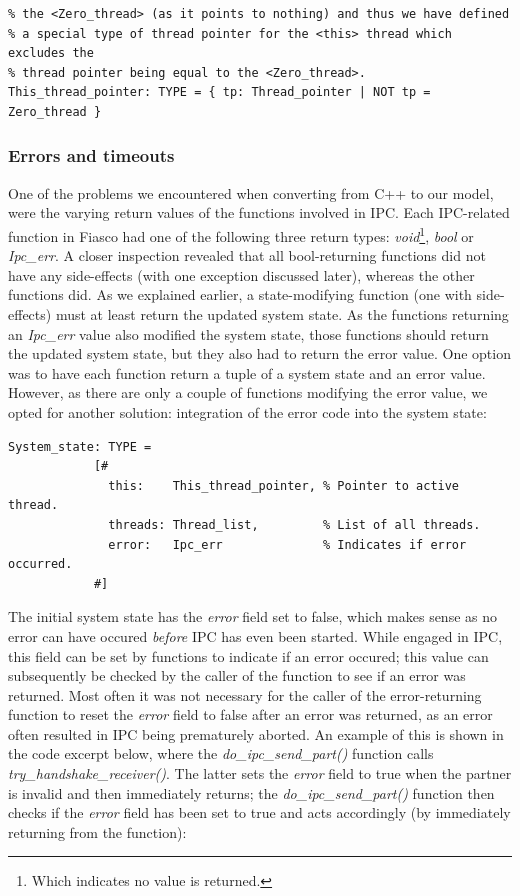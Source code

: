 \lstset{language=PVS}
\begin{lstlisting}[caption={PVS: definition of special this pointer type.}]
% The pointer to the current active thread (the <this> thread) must never be
% the <Zero_thread> (as it points to nothing) and thus we have defined
% a special type of thread pointer for the <this> thread which excludes the
% thread pointer being equal to the <Zero_thread>.
This_thread_pointer: TYPE = { tp: Thread_pointer | NOT tp = Zero_thread }
\end{lstlisting}

\subsubsection{Errors and timeouts}
One of the problems we encountered when converting from C++ to our model, were the varying return values of the functions involved in IPC. Each IPC-related function in Fiasco had one of the following three return types: \emph{void}\footnote{Which indicates no value is returned.}, \emph{bool} or \emph{Ipc\_err}. A closer inspection revealed that all bool-returning functions did not have any side-effects (with one exception discussed later), whereas the other functions did. As we explained earlier, a state-modifying function (one with side-effects) must at least return the updated system state. As the functions returning an \emph{Ipc\_err} value also modified the system state, those functions should return the updated system state, but they also had to return the error value. One option was to have each function return a tuple of a system state and an error value. However, as there are only a couple of functions modifying the error value, we opted for another solution: integration of the error code into the system state:

\lstset{language=PVS}
\begin{lstlisting}[caption={PVS: incomplete system state, with integrated error field.}]
System_state: TYPE = 
            [# 
              this:    This_thread_pointer, % Pointer to active thread.
              threads: Thread_list,         % List of all threads.
              error:   Ipc_err              % Indicates if error occurred.
            #]
\end{lstlisting}

The initial system state has the \emph{error} field set to false, which makes sense as no error can have occured \textit{before} IPC has even been started. While engaged in IPC, this field can be set by functions to indicate if an error occured; this value can subsequently be checked by the caller of the function to see if an error was returned. Most often it was not necessary for the caller of the error-returning function to reset the \emph{error} field to false after an error was returned, as an error often resulted in IPC being prematurely aborted. An example of this is shown in the code excerpt below, where the \emph{do\_ipc\_send\_part()} function calls \emph{try\_handshake\_receiver()}. The latter sets the \emph{error} field to true when the partner is invalid and then immediately returns; the \emph{do\_ipc\_send\_part()} function then checks if the \emph{error} field has been set to true and acts accordingly (by immediately returning from the function):

